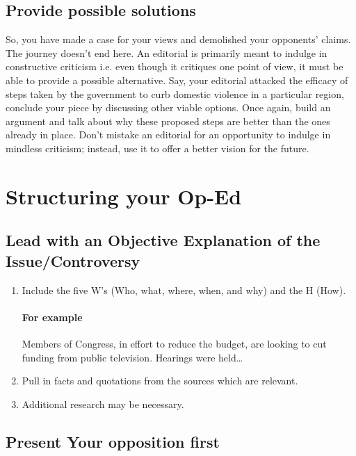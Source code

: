 \documentclass{tufte-handout}\usepackage[]{graphicx}\usepackage[]{color}
\begin{document}
\subsection{Provide possible solutions}
So, you have made a case for your views and demolished your opponents' claims. The journey doesn't end here. An editorial is primarily meant to indulge in constructive criticism i.e. even though it critiques one point of view, it must be able to provide a possible alternative. Say, your editorial attacked the efficacy of steps taken by the government to curb domestic violence in a particular region, conclude your piece by discussing other viable options. Once again, build an argument and talk about why these proposed steps are better than the ones already in place. Don't mistake an editorial for an opportunity to indulge in mindless criticism; instead, use it to offer a better vision for the future.

\section{Structuring your Op-Ed}

\subsection{Lead with an Objective Explanation of the Issue/Controversy}

\begin{enumerate}
	\item Include the five W's  (Who, what, where, when, and why) and the H (How). 

\paragraph{For example}

Members of Congress, in effort to reduce the budget, are looking to cut funding from public television. Hearings were held\ldots

	\item Pull in facts and quotations from the sources which are relevant.
	\item Additional research may be necessary.
\end{enumerate}

\subsection{Present Your opposition first} 
\end{document}
